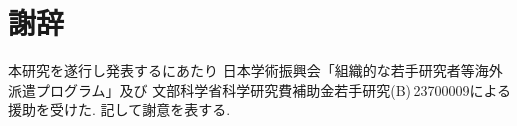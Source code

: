 \section*{謝辞}

本研究を遂行し発表するにあたり
日本学術振興会「組織的な若手研究者等海外派遣プログラム」及び
文部科学省科学研究費補助金若手研究(B)\,23700009による援助を受けた. 
記して謝意を表する. 

